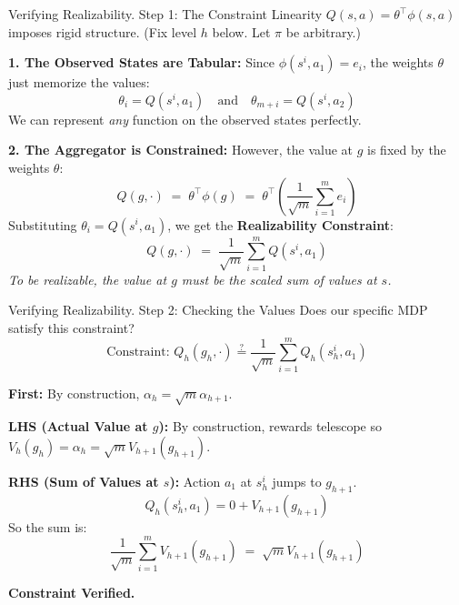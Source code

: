 \documentclass[aspectratio=169]{beamer}
\begin{document}
\begin{frame}{Verifying Realizability. Step 1: The Constraint}
    Linearity $Q(s,a) = \theta^\top \phi(s,a)$ imposes rigid
    structure. (Fix level $h$ below. Let $\pi$ be arbitrary.)
    
    \vspace{0.1cm}
    
\pause    \textbf{1. The Observed States are Tabular:}
    Since $\phi(s^i, a_1) = e_i$, the weights $\theta$ just memorize the values:
    \[
    \theta_i = Q(s^i, a_1) \quad \text{and} \quad \theta_{m+i} = Q(s^i, a_2)
    \]
    We can represent \emph{any} function on the observed states perfectly.
    
    \vspace{0.1cm}
    
\pause    \textbf{2. The Aggregator is Constrained:}
    However, the value at $g$ is fixed by the weights $\theta$:
    \[
    Q(g, \cdot) \;=\; \theta^\top \phi(g) \;=\; \theta^\top \left( \frac{1}{\sqrt{m}} \sum_{i=1}^m e_i \right)
    \]
    Substituting $\theta_i = Q(s^i, a_1)$, we get the \textbf{Realizability Constraint}:
    \[
    \boxed{ Q(g, \cdot) \;=\; \frac{1}{\sqrt{m}} \sum_{i=1}^m Q(s^i, a_1) }
    \]
    \small
    \emph{To be realizable, the value at $g$ must be the scaled sum of values at $s$.}
\end{frame}

\begin{frame}{Verifying Realizability. Step 2: Checking the Values}
    Does our specific MDP satisfy this constraint?
    \[
    \text{Constraint: } Q_h(g_h, \cdot) \overset{?}{=} \frac{1}{\sqrt{m}} \sum_{i=1}^m Q_h(s_h^i, a_1)
    \]

\pause    \textbf{First:}
    By construction, $\alpha_h = \sqrt{m} \alpha_{h+1}$.
    
\pause    \textbf{LHS (Actual Value at $g$):}
    By construction, rewards telescope so $V_h(g_h) = \alpha_h=\sqrt{m}V_{h+1}(g_{h+1})$.
    
    \vspace{0.2cm}
    
\pause    \textbf{RHS (Sum of Values at $s$):}
    Action $a_1$ at $s_h^i$ jumps to $g_{h+1}$.
    \[
    Q_h(s_h^i, a_1) = 0 + V_{h+1}(g_{h+1}) %
    \]
    So the sum is:
    \[
    \frac{1}{\sqrt{m}} \sum_{i=1}^m V_{h+1}(g_{h+1}) \;=\; \sqrt{m} V_{h+1}(g_{h+1})
    \]

    \textcolor{green!60!black}{\textbf{Constraint Verified.}}
\end{frame}
\end{document}
